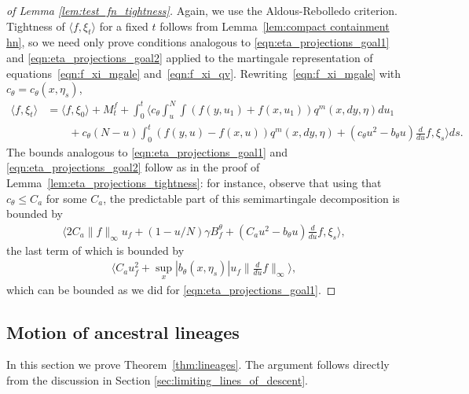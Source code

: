 \documentclass[EJP]{ejpecp} %
\newcommand{\lp}{\xi}              %
\begin{document}
\begin{proof}[of Lemma \ref{lem:test_fn_tightness}]
    Again, we use the Aldous-Rebolledo criterion.
    Tightness of $\langle f, \lp_t \rangle$ for a fixed $t$
    follows from Lemma~\ref{lem:compact containment hn},
    so we need only prove conditions analogous to
    \eqref{eqn:eta_projections_goal1}
    and \eqref{eqn:eta_projections_goal2}
    applied to the martingale representation
    of equations~\eqref{eqn:f_xi_mgale} and~\eqref{eqn:f_xi_qv}.
    Rewriting~\eqref{eqn:f_xi_mgale} with $c_\theta = c_\theta(x, \eta_s)$,
    \begin{align*}
        \langle f, \lp_t \rangle
        &=
        \langle f, \lp_0 \rangle
        + M^f_t
        + \int_0^t \Big\langle
            c_\theta \int_u^N \int (f(y, u_1) + f(x, u_1)) q^m(x,dy,\eta) du_1
        \\ {} &\qquad
            + c_\theta (N - u) \int_0^t (f(y, u) - f(x, u)) q^m(x,dy,\eta)
            + (c_\theta u^2 - b_\theta u) \frac{d}{du} f,
            \lp_s
        \Big\rangle ds .
    \end{align*}
    The bounds analogous to \eqref{eqn:eta_projections_goal1} and \eqref{eqn:eta_projections_goal2}
    follow as in the proof of Lemma~\ref{lem:eta_projections_tightness}:
    for instance, observe that using that $c_\theta \le C_a$ for some $C_a$,
    the predictable part of this semimartingale decomposition is bounded by
    \begin{align*}
        \Big\langle
            2 C_a \|f\|_\infty u_f
            + (1 - u/N) \gamma B^\theta_f
            + (C_a u^2 - b_\theta u) \frac{d}{du} f,
            \lp_s
        \Big\rangle ,
    \end{align*}
    the last term of which is bounded by
    \begin{align*}
        \langle
            C_a u_f^2 + \sup_x |b_\theta(x, \eta_s)| u_f \|\frac{d}{du} f\|_\infty
        \rangle ,
    \end{align*}
    which can be bounded as we did for \eqref{eqn:eta_projections_goal1}.
\end{proof}

\subsection{Motion of ancestral lineages}
\label{sec:lineages_proof}

In this section we prove Theorem~\ref{thm:lineages}.
The argument follows directly from the discussion in Section \ref{sec:limiting_lines_of_descent}.
\end{document}
